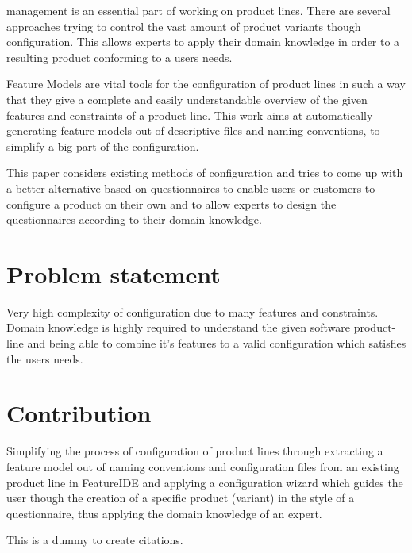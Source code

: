 % 
% 
% 
% 
 management is an essential part of working on product lines. There are several approaches trying to control the vast amount of product variants though configuration. This allows experts to apply their domain knowledge in order to a resulting product conforming to a users needs.

Feature Models are vital tools for the configuration of product lines in such a way that they give a complete and easily understandable overview of the given features and constraints of a product-line. This work aims at automatically generating feature models out of descriptive files and naming conventions, to simplify a big part of the configuration.

This paper considers existing methods of configuration and tries to come up with a better alternative based on questionnaires to enable users or customers to configure a product on their own and to allow experts to design the questionnaires according to their domain knowledge.

\section*{Problem statement}
Very high complexity of configuration due to many features and constraints. Domain knowledge is highly required to understand the given software product-line and being able to combine it's features to a valid configuration which satisfies the users needs.

\section*{Contribution}

Simplifying the process of configuration of product lines through extracting a feature model out of naming conventions and configuration files from an existing product line in FeatureIDE and applying a configuration wizard which guides the user though the creation of a specific product (variant) in the style of a questionnaire, thus applying the domain knowledge of an expert.

This\cite{fpe} is\cite{qdc} a\cite{qbvm} dummy\cite{fmgp} to create citations.